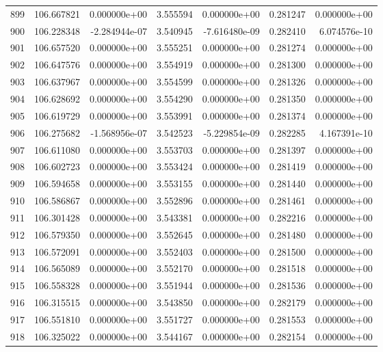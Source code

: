 \begin{tabular}{rrrrrrr}
 899 & 106.667821 &  0.000000e+00 &  3.555594 &  0.000000e+00 &   0.281247 &  0.000000e+00 \\
 900 & 106.228348 & -2.284944e-07 &  3.540945 & -7.616480e-09 &   0.282410 &  6.074576e-10 \\
 901 & 106.657520 &  0.000000e+00 &  3.555251 &  0.000000e+00 &   0.281274 &  0.000000e+00 \\
 902 & 106.647576 &  0.000000e+00 &  3.554919 &  0.000000e+00 &   0.281300 &  0.000000e+00 \\
 903 & 106.637967 &  0.000000e+00 &  3.554599 &  0.000000e+00 &   0.281326 &  0.000000e+00 \\
 904 & 106.628692 &  0.000000e+00 &  3.554290 &  0.000000e+00 &   0.281350 &  0.000000e+00 \\
 905 & 106.619729 &  0.000000e+00 &  3.553991 &  0.000000e+00 &   0.281374 &  0.000000e+00 \\
 906 & 106.275682 & -1.568956e-07 &  3.542523 & -5.229854e-09 &   0.282285 &  4.167391e-10 \\
 907 & 106.611080 &  0.000000e+00 &  3.553703 &  0.000000e+00 &   0.281397 &  0.000000e+00 \\
 908 & 106.602723 &  0.000000e+00 &  3.553424 &  0.000000e+00 &   0.281419 &  0.000000e+00 \\
 909 & 106.594658 &  0.000000e+00 &  3.553155 &  0.000000e+00 &   0.281440 &  0.000000e+00 \\
 910 & 106.586867 &  0.000000e+00 &  3.552896 &  0.000000e+00 &   0.281461 &  0.000000e+00 \\
 911 & 106.301428 &  0.000000e+00 &  3.543381 &  0.000000e+00 &   0.282216 &  0.000000e+00 \\
 912 & 106.579350 &  0.000000e+00 &  3.552645 &  0.000000e+00 &   0.281480 &  0.000000e+00 \\
 913 & 106.572091 &  0.000000e+00 &  3.552403 &  0.000000e+00 &   0.281500 &  0.000000e+00 \\
 914 & 106.565089 &  0.000000e+00 &  3.552170 &  0.000000e+00 &   0.281518 &  0.000000e+00 \\
 915 & 106.558328 &  0.000000e+00 &  3.551944 &  0.000000e+00 &   0.281536 &  0.000000e+00 \\
 916 & 106.315515 &  0.000000e+00 &  3.543850 &  0.000000e+00 &   0.282179 &  0.000000e+00 \\
 917 & 106.551810 &  0.000000e+00 &  3.551727 &  0.000000e+00 &   0.281553 &  0.000000e+00 \\
 918 & 106.325022 &  0.000000e+00 &  3.544167 &  0.000000e+00 &   0.282154 &  0.000000e+00 \\

\end{tabular}
